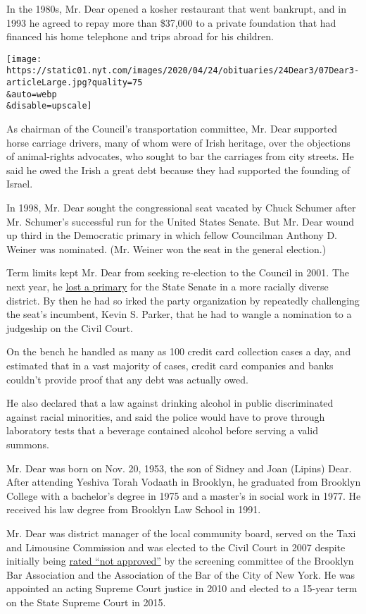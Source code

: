 In the 1980s, Mr. Dear opened a kosher restaurant that went bankrupt,
and in 1993 he agreed to repay more than \$37,000 to a private
foundation that had financed his home telephone and trips abroad for his
children.

\texttt{[image: https://static01.nyt.com/images/2020/04/24/obituaries/24Dear3/07Dear3-articleLarge.jpg?quality=75\\\&auto=webp\\\&disable=upscale]}

As chairman of the Council's transportation committee, Mr. Dear
supported horse carriage drivers, many of whom were of Irish heritage,
over the objections of animal-rights advocates, who sought to bar the
carriages from city streets. He said he owed the Irish a great debt
because they had supported the founding of Israel.

In 1998, Mr. Dear sought the congressional seat vacated by Chuck Schumer
after Mr. Schumer's successful run for the United States Senate. But Mr.
Dear wound up third in the Democratic primary in which fellow Councilman
Anthony D. Weiner was nominated. (Mr. Weiner won the seat in the general
election.)

Term limits kept Mr. Dear from seeking re-election to the Council in
2001. The next year, he
\href{https://www.nytimes.com/2002/08/22/nyregion/four-way-race-in-brooklyn-for-a-redrawn-senate-district.html}{lost
a primary} for the State Senate in a more racially diverse district. By
then he had so irked the party organization by repeatedly challenging
the seat's incumbent, Kevin S. Parker, that he had to wangle a
nomination to a judgeship on the Civil Court.

On the bench he handled as many as 100 credit card collection cases a
day, and estimated that in a vast majority of cases, credit card
companies and banks couldn't provide proof that any debt was actually
owed.

He also declared that a law against drinking alcohol in public
discriminated against racial minorities, and said the police would have
to prove through laboratory tests that a beverage contained alcohol
before serving a valid summons.

Mr. Dear was born on Nov. 20, 1953, the son of Sidney and Joan (Lipins)
Dear. After attending Yeshiva Torah Vodaath in Brooklyn, he graduated
from Brooklyn College with a bachelor's degree in 1975 and a master's in
social work in 1977. He received his law degree from Brooklyn Law School
in 1991.

Mr. Dear was district manager of the local community board, served on
the Taxi and Limousine Commission and was elected to the Civil Court in
2007 despite initially being
\href{https://cityroom.blogs.nytimes.com/2007/09/20/not-approved-but-noach-dear-is-victorious/}{rated
``not approved''} by the screening committee of the Brooklyn Bar
Association and the Association of the Bar of the City of New York. He
was appointed an acting Supreme Court justice in 2010 and elected to a
15-year term on the State Supreme Court in 2015.

